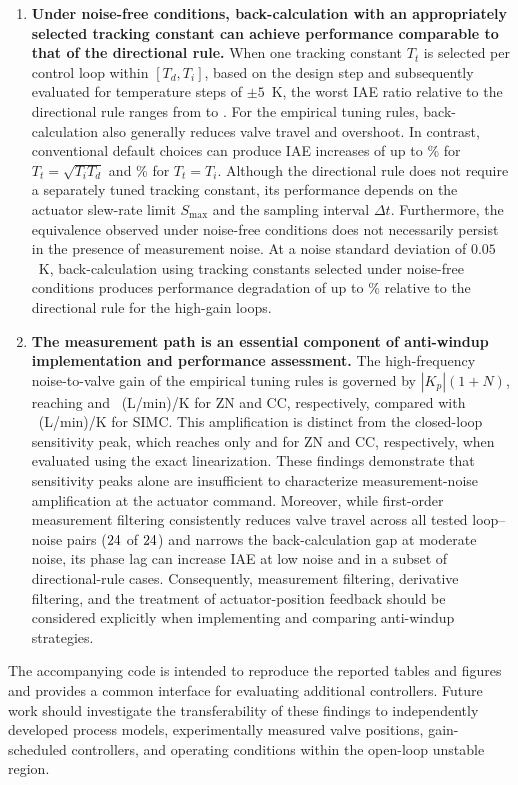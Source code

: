 \begin{enumerate}
\item \textbf{Under noise-free conditions, back-calculation with an appropriately selected tracking constant can achieve performance comparable to that of the directional rule.}
When one tracking constant $T_t$ is selected per control loop within $[T_d,T_i]$, based on the design step and subsequently evaluated for temperature steps of $\pm 5$~K, the worst IAE ratio relative to the directional rule ranges from \vttcvmin{} to \vttcvmax{}. For the empirical tuning rules, back-calculation also generally reduces valve travel and overshoot. In contrast, conventional default choices can produce IAE increases of up to \vttsqrtmaxpct{}\% for $T_t=\sqrt{T_iT_d}$ and \vtttimaxpct{}\% for $T_t=T_i$. Although the directional rule does not require a separately tuned tracking constant, its performance depends on the actuator slew-rate limit $S_{\max}$ and the sampling interval $\Delta t$. Furthermore, the equivalence observed under noise-free conditions does not necessarily persist in the presence of measurement noise. At a noise standard deviation of $0.05$~K, back-calculation using tracking constants selected under noise-free conditions produces performance degradation of up to \vnzbchimaxpct{}\% relative to the directional rule for the high-gain loops.

\item \textbf{The measurement path is an essential component of anti-windup implementation and performance assessment.}
The high-frequency noise-to-valve gain of the empirical tuning rules is governed by $|K_p|(1+N)$, reaching \vCSZN{} and \vCSCC{}~(L/min)/K for ZN and CC, respectively, compared with \vCSSIMC{}~(L/min)/K for SIMC. This amplification is distinct from the closed-loop sensitivity peak, which reaches only \vSlinZN{} and \vSlinCC{} for ZN and CC, respectively, when evaluated using the exact linearization. These findings demonstrate that sensitivity peaks alone are insufficient to characterize measurement-noise amplification at the actuator command. Moreover, while first-order measurement filtering consistently reduces valve travel across all tested loop--noise pairs ($24$ of $24$) and narrows the back-calculation gap at moderate noise, its phase lag can increase IAE at low noise and in a subset of directional-rule cases. Consequently, measurement filtering, derivative filtering, and the treatment of actuator-position feedback should be considered explicitly when implementing and comparing anti-windup strategies.

\end{enumerate}

The accompanying code is intended to reproduce the reported tables and figures and provides a common interface for evaluating additional controllers. Future work should investigate the transferability of these findings to independently developed process models, experimentally measured valve positions, gain-scheduled controllers, and operating conditions within the open-loop unstable region.
